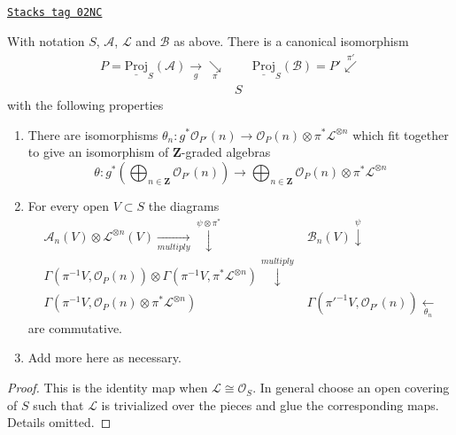 \begin{lemma}
\label{constructions-lemma-twisting-and-proj}
\href{https://stacks.math.columbia.edu/tag/02NC}{\texttt{Stacks tag 02NC}}

With notation $S$, $\mathcal{A}$, $\mathcal{L}$ and $\mathcal{B}$ as
above. There is a canonical isomorphism
$$
\begin{array}{ccc}P = \underline{\text{Proj}}_S(\mathcal{A})
\underset{g}{\longrightarrow}\underset{\pi}{\searrow} &  & \underline{\text{Proj}}_S(\mathcal{B}) = P'
\overset{\pi'}{\swarrow} \\  & S & \end{array}
$$
with the following properties
\begin{enumerate}
\item There are isomorphisms
$\theta_n : g^*\mathcal{O}_{P'}(n)
\to
\mathcal{O}_P(n) \otimes \pi^*\mathcal{L}^{\otimes n}$
which fit together to give an isomorphism of $\mathbf{Z}$-graded
algebras
$$
\theta :
g^*\left(
\bigoplus\nolimits_{n \in \mathbf{Z}} \mathcal{O}_{P'}(n)
\right)
\longrightarrow
\bigoplus\nolimits_{n \in \mathbf{Z}} \mathcal{O}_P(n)
\otimes \pi^*\mathcal{L}^{\otimes n}
$$
\item For every open $V \subset S$ the diagrams
$$
\begin{array}{cc}\mathcal{A}_n(V) \otimes \mathcal{L}^{\otimes n}(V)
\underset{multiply}{\longrightarrow}\overset{\psi \otimes \pi^*}{\downarrow} & \mathcal{B}_n(V) \overset{\psi}{\downarrow} \\ \Gamma(\pi^{-1}V, \mathcal{O}_P(n)) \otimes
\Gamma(\pi^{-1}V, \pi^*\mathcal{L}^{\otimes n})
\overset{multiply}{\downarrow} &  \\ \Gamma(\pi^{-1}V, \mathcal{O}_P(n) \otimes \pi^*\mathcal{L}^{\otimes n}) & \Gamma(\pi'^{-1}V, \mathcal{O}_{P'}(n)) \underset{\theta_n}{\longleftarrow}\end{array}
$$
are commutative.
\item Add more here as necessary.
\end{enumerate}
\end{lemma}

\begin{proof}
This is the identity map when $\mathcal{L} \cong \mathcal{O}_S$.
In general choose an open covering of $S$ such that $\mathcal{L}$
is trivialized over the pieces and glue the corresponding maps.
Details omitted.
\end{proof}

